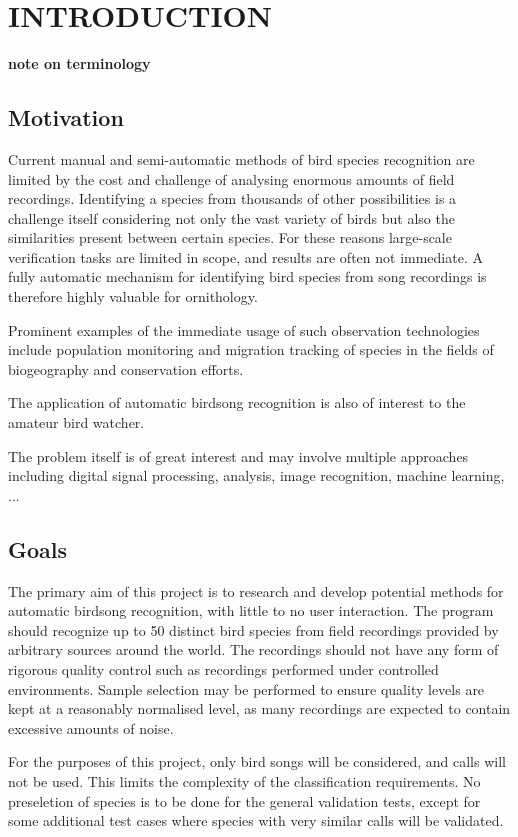 \chapter{INTRODUCTION}

\textbf{note on terminology}

\section{Motivation}
Current manual and semi-automatic methods of bird species recognition are limited
by the cost and challenge of analysing enormous amounts of field recordings.
Identifying a species from thousands of other possibilities is a challenge itself
considering not only the vast variety of birds but also the similarities
present between certain species.
For these reasons large-scale verification tasks are limited in scope, and results
are often not immediate.
A fully automatic mechanism for identifying bird species from song recordings is
therefore highly valuable for ornithology.

Prominent examples of the immediate usage of such observation technologies include
population monitoring and migration tracking of species in the fields of
biogeography and conservation efforts.

The application of automatic birdsong recognition is also of interest to the
amateur bird watcher.

The problem itself is of great interest and may involve multiple approaches
including digital signal processing, analysis, image recognition, machine learning,
...

\section{Goals}
The primary aim of this project is to research and develop potential methods
for automatic birdsong recognition, with little to no user interaction.
The program should recognize up to 50 distinct bird species from field recordings
provided by arbitrary sources around the world.
The recordings should not have any form of rigorous quality control such as
recordings performed under controlled environments.
Sample selection may be performed to ensure quality levels are kept at a
reasonably normalised level, as many recordings are expected to contain
excessive amounts of noise.

For the purposes of this project, only bird songs will be considered, and calls
will not be used.
This limits the complexity of the classification requirements.
No preseletion of species is to be done for the general validation tests, except
for some additional test cases where species with very similar calls will be
validated.
